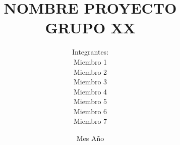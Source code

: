 \documentclass[pdftex,spanish]{pucthesis}	%
\begin{document}

\title[NOMBRE PROYECTO\\ GRUPO XX]
   {\bf NOMBRE PROYECTO\\ GRUPO XX}       
\author[Integrantes:]{Integrantes:\\
\textnormal{\small{
Miembro 1\\
Miembro 2\\
Miembro 3\\
Miembro 4\\
Miembro 5\\
Miembro 6\\
Miembro 7}
}
}

\address{Escuela de Ingenier\'ia\\
                   Pontificia Universidad Cat\'olica de Chile\\ 
                   Vicu\~na Mackenna 4860\\
                  Santiago, Chile\\
                  {\it Tel.\/} : 56 (2) 354-2000}


\date                                 {Mes Año}


\NoChapterPageNumber
{}
\maketitle




\end{document}
